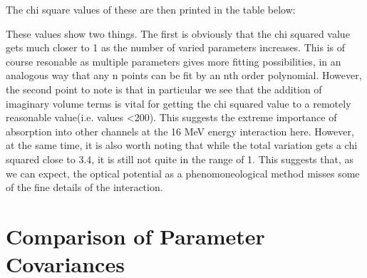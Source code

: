 \documentclass[11pt]{article} %
\begin{document}
The chi square values of these are then printed in the table below:\\
\begin{table}[hbt!]
\centering
\caption{Chi Squares For Different SFresco Variations}
\end{table}
\FloatBarrier
These values show two things. The first is obviously that the chi squared value gets much closer to 1 as the number of varied parameters increases. This is of course resonable as multiple parameters gives more fitting possibilities, in an analogous way that any n points can be fit by an nth order polynomial. However, the second point to note is that in particular we see that the addition of imaginary volume terms is vital for getting the chi squared value to a remotely reasonable value(i.e. values <200). This suggests the extreme importance of absorption into other channels at the 16 MeV energy interaction here. However, at the same time, it is also worth noting that while the total variation gets a chi squared close to $3.4$, it is still not quite in the range of 1. This suggests that, as we can expect, the optical potential as a phenomoneological method misses some of the fine details of the interaction.\\
 
\section{Comparison of Parameter Covariances}
\end{document}

